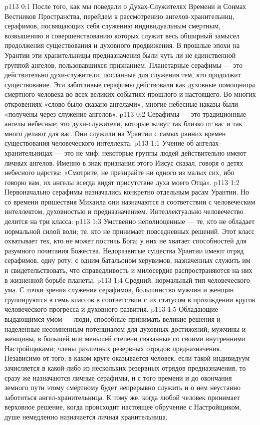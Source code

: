 \author{Глава Серафимов}
\vs p113 0:1 После того, как мы поведали о Духах\hyp{}Служителях Времени и Сонмах Вестников Пространства, перейдем к рассмотрению ангелов\hyp{}хранительниц, серафимов, посвящающих себя служению индивидуальным смертным, возвышению и совершенствованию которых служит весь обширный замысел продолжения существования и духовного продвижения. В прошлые эпохи на Урантии эти хранительницы предназначения были чуть ли не единственной группой ангелов, пользовавшихся признанием. Планетарные серафимы --- это действительно духи\hyp{}служители, посланные для служения тем, кто продолжит существование. Эти заботливые серафимы действовали как духовные помощницы смертного человека во всех великих событиях прошлого и настоящего. Во многих откровениях «слово было сказано ангелами»; многие небесные наказы были «получены через служение ангелов».
\vs p113 0:2 Серафимы --- это традиционные ангелы небесные; это духи\hyp{}служители, которые живут так близко от вас и так много делают для вас. Они служили на Урантии с самых ранних времен существования человеческого интеллекта.
\vs p113 1:1 Учение об ангелах\hyp{}хранительницах --- это не миф; некоторые группы людей действительно имеют личных ангелов. Именно в знак признания этого Иисус сказал, говоря о детях небесного царства: «Смотрите, не презирайте ни одного из малых сих, ибо говорю вам, их ангелы всегда видят присутствие духа моего Отца».
\vs p113 1:2 Первоначально серафимы назначались конкретно отдельным расам Урантии. Но со времени пришествия Михаила они назначаются в соответствии с человеческим интеллектом, духовностью и предназначением. Интеллектуально человечество делится на три класса:
\vs p113 1:3 \bibnobreakspace Умственно неполноценные --- те, кто не обладает нормальной силой воли; те, кто не принимает повседневных решений. Этот класс охватывает тех, кто не может постичь Бога; у них не хватает способностей для разумного почитания Божества. Недоразвитые существа Урантии имеют отряд серафимов, одну роту, с одним батальоном херувимов, назначенных служить им и свидетельствовать, что справедливость и милосердие распространяются на них в жизненной борьбе планеты.
\vs p113 1:4 \bibnobreakspace Средний, нормальный тип человеческого ума. С точки зрения служения серафимов, большинство мужчин и женщин группируются в семь классов в соответствии с их статусом в прохождении кругов человеческого прогресса и духовного развития.
\vs p113 1:5 \bibnobreakspace Обладающие выдающимся умом --- люди, способные принимать великие решения и наделенные несомненным потенциалом для духовных достижений; мужчины и женщины, в большей или меньшей степени связанные со своими внутренними Настройщиками; члены различных резервных отрядов предназначения. Независимо от того, в каком круге оказывается человек, если такой индивидуум зачисляется в какой\hyp{}либо из нескольких резервных отрядов предназначения, то сразу же назначаются личные серафимы, и с того времени и до окончания земного пути этому смертному будет непрерывно служить и о нем неустанно заботиться ангел\hyp{}хранительница. К тому же, когда любой человек принимает  верховное решение, когда происходит настоящее обручение с Настройщиком, душе немедленно назначается личная хранительница.
